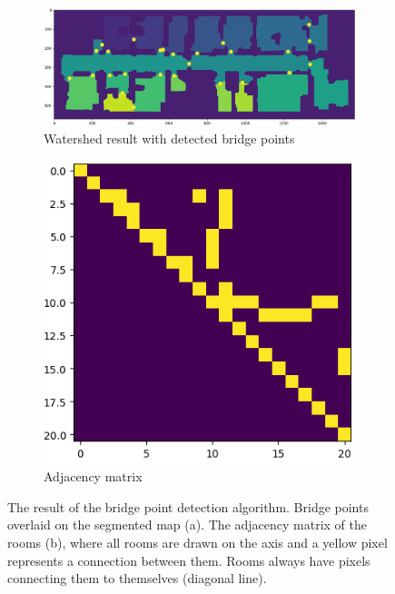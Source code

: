 \begin{figure}[h]
    \captionsetup[subfigure]{justification=centering}
    \centering
    \begin{subfigure}{.65\textwidth}
      \centering
      \includegraphics[width=\textwidth]{figures/50_implementation/ryu_bridge_nodes.png}
      \caption{Watershed result with detected bridge points}
    \end{subfigure}%
    \begin{subfigure}{.25\textwidth}
      \centering
      \includegraphics[width=\textwidth]{figures/50_implementation/ryu_adjacency_matrix.png}
      \caption{Adjacency matrix}
    \end{subfigure}
    \caption[The result of the bridge point detection algorithm]{The result of the bridge point detection algorithm. Bridge points overlaid on the segmented map (a). The adjacency matrix of the rooms (b), where all rooms are drawn on the axis and a yellow pixel represents a connection between them. Rooms always have pixels connecting them to themselves (diagonal line).}
    \label{fig:bridge_nodes}
\end{figure}

